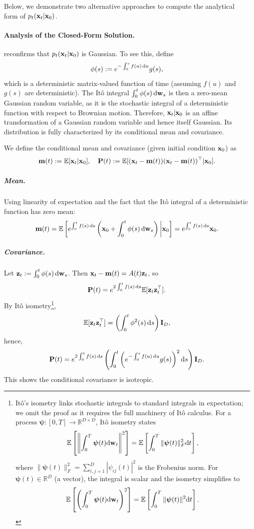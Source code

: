 Below, we demonstrate two alternative approaches to compute the analytical form of $p_t({\mathbf{x}}_t|{\mathbf{x}}_0)$.

\paragraph{Analysis of the Closed-Form Solution.}  reconfirms that $p_t({\mathbf{x}}_t|{\mathbf{x}}_0)$ is Gaussian. To see this, define
\[
\phi(s) := e^{-\int_0^s f(u) \mathop{}\!\mathrm{d} u} g(s),
\]
which is a deterministic matrix-valued function of time (assuming $f(u)$ and $g(s)$ are deterministic). The It\^o integral $\int_0^t \phi(s) \mathop{}\!\mathrm{d} {\mathbf{w}}_s$ is then a zero-mean Gaussian random variable, as it is the stochastic integral of a deterministic function with respect to Brownian motion. Therefore, ${\mathbf{x}}_t|{\mathbf{x}}_0$ is an affine transformation of a Gaussian random variable and hence itself Gaussian. Its distribution is fully characterized by its conditional mean and covariance.

We define the conditional mean and covariance (given initial condition ${\mathbf{x}}_0$) as
\[
{\mathbf{m}}(t) := \mathbb{E}[{\mathbf{x}}_t | {\mathbf{x}}_0], \quad {\mathbf{P}}(t) := \mathbb{E}[({\mathbf{x}}_t - {\mathbf{m}}(t))({\mathbf{x}}_t - {\mathbf{m}}(t))^\top|{\mathbf{x}}_0].
\]

\subparagraph{Mean.}
Using linearity of expectation and the fact that the It\^o integral of a deterministic function has zero mean:
\begin{align*}
    {\mathbf{m}}(t) = \mathbb{E}\left[ e^{\int_0^t f(s) \mathop{}\!\mathrm{d} s} \left( {\mathbf{x}}_0 + \int_0^t \phi(s) \mathop{}\!\mathrm{d} {\mathbf{w}}_s \right) \bigg| {\mathbf{x}}_0 \right] = e^{\int_0^t f(s) \mathop{}\!\mathrm{d} s} {\mathbf{x}}_0.
\end{align*}

\subparagraph{Covariance.}
Let  ${\mathbf{z}}_t := \int_0^t \phi(s) \mathop{}\!\mathrm{d} {\mathbf{w}}_s$. Then ${\mathbf{x}}_t - {\mathbf{m}}(t) = A(t) {\mathbf{z}}_t$, so
\[
{\mathbf{P}}(t) = e^{2\int_0^t f(s) \mathop{}\!\mathrm{d} s} \mathbb{E}[{\mathbf{z}}_t {\mathbf{z}}_t^\top].
\]
By It\^o isometry\footnote{It\^o's isometry links stochastic integrals to standard integrals in expectation; we omit the proof as it requires the full machinery of It\^o calculus. For a process $\bm{\psi} : [0,T] \to \mathbb{R}^{D \times D}$, It\^o isometry states
\[
\mathbb{E}\left[\left\| \int_0^T \bm{\psi}(t)   \mathrm{d}{\mathbf{w}}_t \right\|^2 \right]
= \mathbb{E}\left[\int_0^T \|\bm{\psi}(t)\|_F^2   \mathrm{d}t \right],
\]
where $\|\bm{\psi}(t)\|_F^2 = \sum_{i,j=1}^D |\psi_{ij}(t)|^2$ is the Frobenius norm. For $\bm{\psi}(t) \in \mathbb{R}^D$ (a vector), the integral is scalar and the isometry simplifies to
\[
\mathbb{E}\left[\left(\int_0^T \bm{\psi}(t)   \mathrm{d}{\mathbf{w}}_t\right)^2\right] = \mathbb{E}\left[\int_0^T \|\bm{\psi}(t)\|^2   \mathrm{d}t \right].
\]
},
\[
\mathbb{E}[{\mathbf{z}}_t {\mathbf{z}}_t^\top] = \left( \int_0^t \phi^2(s) \mathop{}\!\mathrm{d} s \right) {\mathbf{I}}_D,
\]
hence,
\[
{\mathbf{P}}(t) = e^{2\int_0^t f(s) \mathop{}\!\mathrm{d} s} \left( \int_0^t \left( e^{-\int_0^s f(u) \mathop{}\!\mathrm{d} u} g(s) \right)^2 \mathop{}\!\mathrm{d} s \right) {\mathbf{I}}_D.
\]
This shows the conditional covariance is isotropic.

